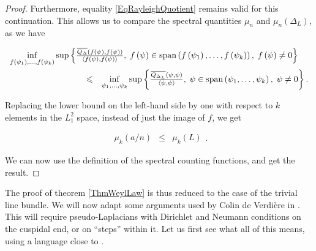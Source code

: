 \documentclass{jams-l}
\theoremstyle{definition}
\theoremstyle{remark}
\numberwithin{equation}{section}
\begin{document}
\begin{proof}
            \noindent Furthermore, equality \eqref{EqRayleighQuotient} remains valid for this continuation. This allows us to compare the spectral quantities $\mu_n$ and $\mu_n \left( \Delta_L \right)$, as we have
            
            \[ \begin{array}{lll}
                    \multicolumn{3}{l}{\inf\limits_{f \left( \psi_1 \right), \dots, f \left( \psi_k \right)} \sup \left \{ \frac{\overline{Q_{\Delta}} \left( f \left( \psi \right), f \left( \psi \right) \right)}{\left< f \left( \psi \right), f \left( \psi \right) \right>}, \; f \left( \psi \right) \in \mathrm{span} \left( f \left( \psi_1 \right), \dots, f \left( \psi_k \right) \right), \; f \left( \psi \right) \neq 0 \right \}} \\[1em]
                    
                    \qquad \qquad \qquad \qquad & \leqslant & \inf\limits_{\psi_1, \dots, \psi_k} \sup \left \{ \frac{\overline{Q_{\Delta_L}} \left( \psi, \psi \right)}{\left< \psi, \psi \right>}, \; \psi \in \mathrm{span} \left( \psi_1, \dots, \psi_k \right), \; \psi \neq 0 \right \}.
                \end{array} \]
            
            \noindent Replacing the lower bound on the left-hand side by one with respect to $k$ elements in the $L_1^2$ space, instead of just the image of $f$, we get
            
            \[ \begin{array}{lll}
                    \mu_k \left( a/n \right) & \leqslant & \mu_k \left( L \right)
                \end{array} . \]
            
            \noindent We can now use the definition of the spectral counting functions, and get the result.
        
        \end{proof}
        
        The proof of theorem \ref{ThmWeylLaw} is thus reduced to the case of the trivial line bundle. We will now adapt some arguments used by Colin de Verdière in \cite[Sec. 4]{MR699488}. This will require pseudo-Laplacians with Dirichlet and Neumann conditions on the cuspidal end, or on ``steps'' within it. Let us first see what all of this means, using a language close to \cite[Sec. I.5]{MR1102675}.
        
\end{document}
